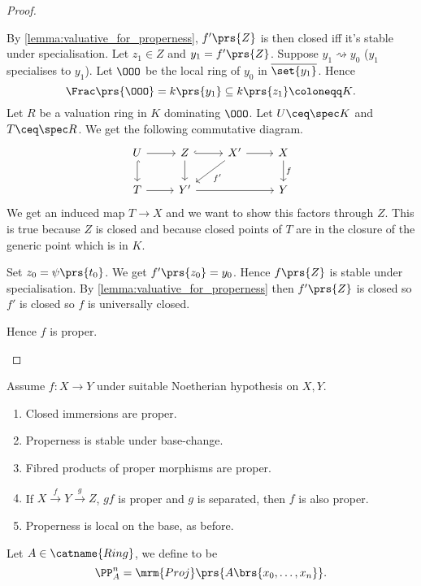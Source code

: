 \documentclass[10pt,a4paper,twoside,openany,hidelinks]{book}
\begin{document}
\begin{proof}
\begin{itemize}
By \ref{lemma:valuative_for_properness}, $f'\prs{Z}$ is then closed iff it's stable under specialisation.
Let $z_1 \in Z$ and $y_1 = f'\prs{Z}$. Suppose $y_1 \rightsquigarrow y_0$ ($y_1$ specialises to $y_1$).
Let $\OOO$ be the local ring of $y_0$ in $\overline{\set{y_1}}$.
Hence \[\Frac\prs{\OOO} = k\prs{y_1} \subseteq k\prs{z_1} \coloneqq K \text{.}\]
Let $R$ be a valuation ring in $K$ dominating $\OOO$.
Let $U \ceq \spec K$ and $T \ceq \spec R$. We get the following commutative diagram.
\[
\begin{tikzcd}
U \arrow[r] \arrow[d, hookrightarrow] & Z \arrow[d] \arrow[r, hookrightarrow] & X' \arrow[dl, "f'"] \arrow[r] & X \arrow[d, "f"] \\
T \arrow[r] & Y' \arrow[rr] & & Y
\end{tikzcd}
\]
We get an induced map $T \to X$ and we want to show this factors through $Z$. This is true because $Z$ is closed and because closed points of $T$ are in the closure of the generic point which is in $K$.

Set $z_0 = \psi\prs{t_0}$. We get $f'\prs{z_0} = y_0$. Hence $f\prs{Z}$ is stable under specialisation. By \ref{lemma:valuative_for_properness} then $f'\prs{Z}$ is closed so $f'$ is closed so $f$ is universally closed.

Hence $f$ is proper.
\end{itemize}
\end{proof}

\begin{corollary}
Assume $f \colon X \to Y$ under suitable Noetherian hypothesis on $X,Y$.
\begin{enumerate}
    \item Closed immersions are proper.
    \item Properness is stable under base-change.
    \item Fibred products of proper morphisms are proper.
    \item If $X \xrightarrow{f} Y \xrightarrow{g} Z$, $gf$ is proper and $g$ is separated, then $f$ is also proper.
    \item Properness is local on the base, as before.
\end{enumerate}
\end{corollary}

\begin{definition}
Let $A \in \catname{Ring}$, we define  to be
$$\PP_A^n = \mrm{Proj}\prs{A \brs{x_0, \ldots, x_n}} \text{.}$$
\end{definition}
\end{document}
